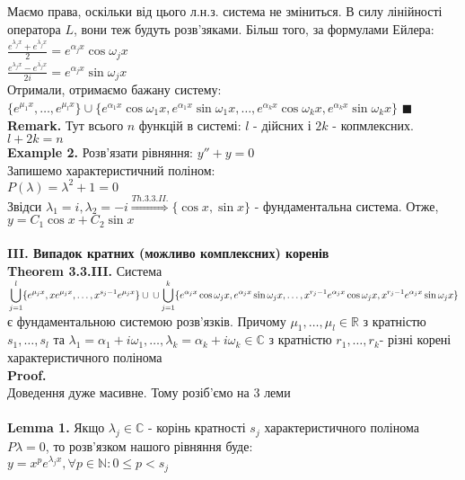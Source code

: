 \documentclass[a4paper, 14pt]{extarticle}
\def\huge{\displaystyle}
\def\lm#1{\textbf{Lemma {#1}}}
\def\th#1{\textbf{Theorem {#1}}}
\def\proof{\textbf{Proof.}\\}
\def\bigline{\vspace{5mm}\\}
\def\qed{$\blacksquare$}
\begin{document}
Маємо права, оскільки від цього л.н.з. система не зміниться. В силу лінійності оператора $L$, вони теж будуть розв'зяками. Більш того, за формулами Ейлера:\\
$\huge \frac{e^{\lambda_j x} + e^{\overline{\lambda_j} x}}{2} = e^{\alpha_j x} \cos \omega_j x$\\
$\huge \frac{e^{\lambda_j x} - e^{\overline{\lambda_j} x}}{2i} = e^{\alpha_j x} \sin \omega_j x$\\
Отримали, отримаємо бажану систему:\\
$\{e^{\mu_1 x}, \dots, e^{\mu_l x}\} \cup \{e^{\alpha_1 x} \cos \omega_1 x, e^{\alpha_1 x} \sin \omega_1 x, \dots, e^{\alpha_k x} \cos \omega_k x, e^{\alpha_k x} \sin \omega_k x\}$ \qed \\
\textbf{Remark.} Тут всього $n$ функцій в системі: $l$ - дійсних і $2k$ - копмлексних. $l + 2k = n$
\bigline
\textbf{Example 2.} Розв'язати рівняння: $y'' + y = 0$\\
Запишемо характеристичний поліном:\\
$P(\lambda) = \lambda^2 + 1 = 0$\\
Звідси $\lambda_1 = i, \lambda_2 = -i \overset{Th. 3.3.II.}{\Rightarrow} \{\cos x, \sin x\}$ - фундаментальна система.
Отже, $y = C_1 \cos x + C_2 \sin x$\\
\bigline
\textbf{III. Випадок кратних (можливо комплексних) коренів}\\
\th{3.3.III.} Система $\\ \huge \bigcup_{j=1}^l \{e^{\mu_j x}, x e^{\mu_j x}, \dots, x^{s_j-1}e^{\mu_j x}\} \cup \\ \cup \huge \bigcup_{j=1}^k \{e^{\alpha_j x} \cos \omega_j x, e^{\alpha_j x} \sin \omega_j x, \dots, x^{r_j-1}e^{\alpha_j x} \cos \omega_j x, x^{r_j-1}e^{\alpha_j x} \sin \omega_j x\}$ \\ є фундаментальною системою розв'язків. Причому $\mu_1, \dots, \mu_l \in \mathbb{R}$ з кратністю $s_1, \dots, s_l$ та $\lambda_1 = \alpha_1 + i\omega_1, \dots, \lambda_k = \alpha_k + i\omega_k \in \mathbb{C}$ з кратністю $r_1, \dots, r_k$- різні корені характеристичного полінома\\
\proof
Доведення дуже масивне. Тому розіб'ємо на 3 леми\\
\\
\lm{1.} Якщо $\lambda_j \in \mathbb{C}$ - корінь кратності $s_j$ характеристичного полінома $P{\lambda} = 0$, то розв'язком нашого рівняння буде:\\
$\huge y = x^p e^{\lambda_j x}, \forall p \in \mathbb{N}: 0 \leq p < s_j$\\
\end{document}
